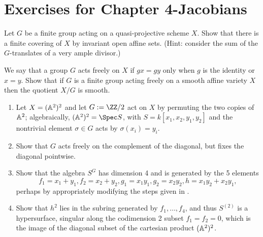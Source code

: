 

\chapter{Exercises for Chapter 4-Jacobians}


\begin{exercise}
 Let $G$ be a finite group acting on a quasi-projective scheme $X$. Show that there is a finite covering of $X$ by invariant open affine sets. (Hint: consider the sum of the $G$-translates of a very ample divisor.)
\end{exercise}


\begin{exercise}\label{free actions}
We say that a group $G$ acts freely on $X$ if $gx = gy$ only when $g$ is the identity or $x=y$. Show that
 if $G$ is a finite group acting freely on a smooth affine variety $X$ then the quotient $X/G$ is smooth.
\end{exercise}


\begin{exercise}
 \label{sym2A2} 
 \begin{enumerate}
 \item Let $X = (\AA^{2})^{2}$ and let $G := \ZZ/2$ act on $X$ by permuting the two copies of  $\AA^{2}$; algebraically,
$(\AA^{2})^{2} = \Spec S$, with $S = k[x_{1},x_{2}, y_{1}, y_{2}]$ and the nontrivial element $\sigma\in G$ acts by
$\sigma(x_{i}) = y_{i}$. 
\item Show that $G$ acts freely on the complement of the diagonal, but fixes the diagonal pointwise.
\item Show that the algebra $S^{G}$ has dimension 4 and is generated by the 5 elements
$$ 
f_{1} = x_{1}+y_{1}, f_{2} = x_{2}+y_{2}, g_{1} = x_{1}y_{1}, g_{2} = x_{2}y_{2}, h = x_{1}y_{2}+x_{2}y_{1},
$$
perhaps by appropriately modifying the steps given in \cite[Exercise 1.6]{Eisenbud1995}. 
\item Show that $h^2$ lies in the subring generated by $f_1,\dots, f_4$, and thus $S^{(2)}$ is a hypersurface, singular
along the  codimension 2 subset $f_{1} = f_{2} = 0$, which is the image of the diagonal subset of the 
cartesian product $(\AA^{2})^{2}$.
\end{enumerate}
\end{exercise}



